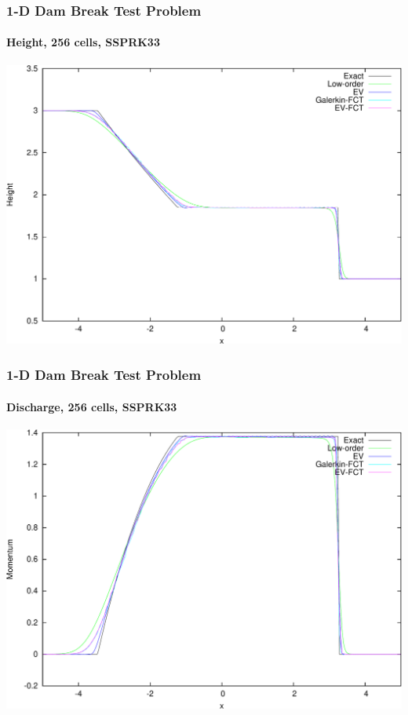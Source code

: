 \begin{frame}
\frametitle{1-D Dam Break Test Problem}
\framesubtitle{Height, 256 cells, SSPRK33}

\begin{center}
\includegraphics[height=0.8\textheight]{./figures/dambreak1d_Height_SSP3_256cells.pdf}
\end{center}

\end{frame}
\begin{frame}
\frametitle{1-D Dam Break Test Problem}
\framesubtitle{Discharge, 256 cells, SSPRK33}

\begin{center}
\includegraphics[height=0.8\textheight]{./figures/dambreak1d_Momentum_SSP3_256cells.pdf}
\end{center}

\end{frame}

